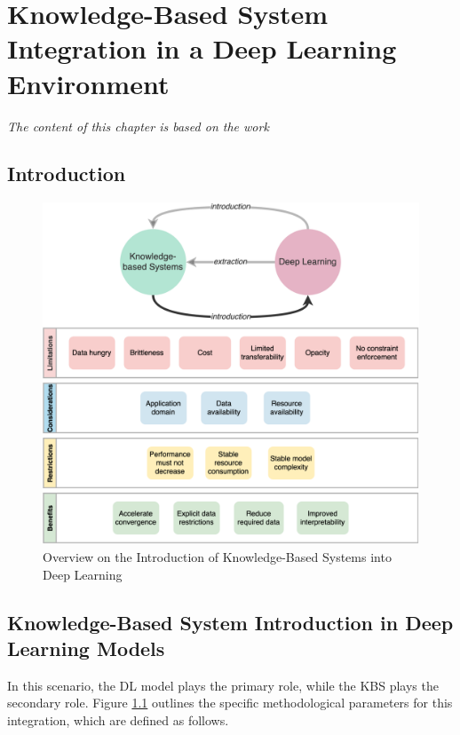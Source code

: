 \chapter{Knowledge-Based System Integration in a Deep Learning Environment}
\label{chap:kbsintegrationdl}
\textit{The content of this chapter is based on the work \cite{amadoretalontodl}}
\section{Introduction}


\begin{figure}[ht]
    \centering
    \includegraphics[width=\linewidth]{4_kbsintegrationdl/figures/overview_kbs_dl_intro.eps}
    \caption{Overview on the Introduction of Knowledge-Based Systems into Deep Learning}
    \label{fig:overview_kbs_dl_intro}
\end{figure}

\section{Knowledge-Based System Introduction in Deep Learning Models} \label{subsec:methods_dl}
In this scenario, the DL model plays the primary role, while the KBS plays the secondary role. Figure \ref{fig:overview_kbs_dl_intro} outlines the specific methodological parameters for this integration, which are defined as follows.

